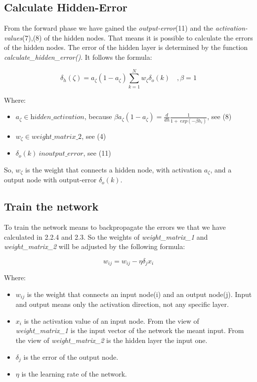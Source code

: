 \documentclass[10pt,a4paper]{article}
\begin{document}
  	\subsection{Calculate Hidden-Error}								%
	From the forward phase we have gained the \textit{output-error}(11) and the \textit{activation-values}(7),(8) of the hidden nodes. That means it is possible to calculate the errors of the hidden nodes. The error of the hidden layer is determined by the function \textit{calculate\_hidden\_error()}. It follows the formula: \\
	 \begin{center}
		\begin{equation}
		\delta_h(\zeta) = a_{\zeta}(1-a_{\zeta}) \sum_{k=1}^{N} w_{\zeta}\delta_o(k) \quad, \beta =1
		\end{equation} 
	\end{center}
	Where:
	\begin{itemize}
		\item $ a_{\zeta} \in \textit{hidden\_activation} $, because $ \beta a_{\zeta}(1-a_{\zeta}) = \frac{d}{dh} \frac{1}{1 + \ exp(-\beta h_i)}$, see (8)
		\item $ w_{\zeta} \in \textit{weight\_matrix\_2}$, see (4)
		\item $ \delta_o(k) \ in \textit{output\_error} $, see (11)
	\end{itemize}
	So, $w_{\zeta}$ is the weight that connects a hidden node, with activation $a_{\zeta}$, and a output node with output-error $\delta_o(k)$.
	\subsection{Train the network}				%
	To train the network means to backpropagate the errors we that we have calculated in 2.2.4 and 2.3. So the weights of \textit{weight\_matrix\_1} and \textit{weight\_matrix\_2} will be adjusted by the following formula:
	\begin{center}
		\begin{equation}
		w_{ij} = w_{ij} - \eta \delta_j x_i
		\end{equation} 
	\end{center}
	Where:
	\begin{itemize}
		\item $w_{ij}$ is the weight that connects an input node(i) and an output node(j). Input and output means only the activation direction, not any specific layer.
		\item $x_i$ is the activation value of an input node. From the view of \textit{weight\_matrix\_1} is the input vector of the network the meant input. From the view of \textit{weight\_matrix\_2} is the hidden layer the input one.
		\item  $\delta_j$ is the error of the output node.
		\item $\eta$ is the learning rate of the network. 

	\end{itemize}   
\end{document}

